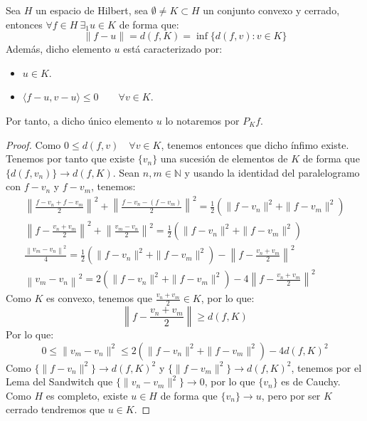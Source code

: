 \begin{teo}[de la Proyección]
    Sea $H$ un espacio de Hilbert, sea $\emptyset \neq K \subset H$ un conjunto convexo y cerrado, entonces $\forall f\in H~\exists_1 u\in K$ de forma que:
    \begin{equation*}
        \|f-u\| = d(f,K) = \inf \{d(f,v) : v\in K\}
    \end{equation*}
    Además, dicho elemento $u$ está caracterizado por:
    \begin{itemize}
        \item $u\in K$.
        \item $\langle f-u,v-u \rangle \leq 0 \qquad \forall v\in K$.
    \end{itemize}
    Por tanto, a dicho único elemento $u$ lo notaremos por $P_Kf$.
    \begin{proof}
        Como $0\leq d(f,v) \quad \forall v\in K$, tenemos entonces que dicho ínfimo existe. Tenemos por tanto que existe $\{v_n\}$ una sucesión de elementos de $K$ de forma que $\{d(f,v_n)\}\to d(f,K)$. Sean $n,m\in \mathbb{N}$ y usando la identidad del paralelogramo con $f-v_n$ y $f-v_m$, tenemos:
        \begin{gather*}
            \left\| \frac{f-v_n + f-v_m}{2} \right\|^2 + \left\| \frac{f-v_n-(f-v_m)}{2} \right\|^2 = \frac{1}{2}\left(\|f-v_n\|^2 + \|f-v_m\|^2\right)\\
            \left\| f - \frac{v_n+v_m}{2} \right\|^2 + \left\| \frac{v_m - v_n}{2} \right\|^2 = \frac{1}{2}\left(\|f-v_n\|^2 + \|f-v_m\|^2\right)\\
            \frac{\left\| v_m-v_n \right\|^2}{4} = \frac{1}{2}\left(\|f-v_n\|^2 + \|f-v_m\|^2\right) - \left\| f - \frac{v_n+v_m}{2} \right\|^2\\
            \left\| v_m-v_n \right\|^2 = 2\left(\|f-v_n\|^2 + \|f-v_m\|^2\right) - 4\left\| f - \frac{v_n+v_m}{2} \right\|^2
        \end{gather*}
        Como $K$ es convexo, tenemos que $\frac{v_n+v_m}{2}\in K$, por lo que:
        \begin{equation*}
            \left\| f-\dfrac{v_n+v_m}{2}\right\| \geq d(f,K)
        \end{equation*}
        Por lo que:
        \begin{equation*}
            0 \leq \|v_m - v_n\|^2 \leq 2(\|f-v_n\|^2 + \|f-v_m\|^2) - 4d(f,K)^2
        \end{equation*}
        Como $\{\|f-v_n\|^2\} \to d(f,K)^2$ y $\{\|f-v_m\|^2\}\to d(f,K)^2$, tenemos por el Lema del Sandwitch que $\{\|v_n - v_m\|^2\}\to 0$, por lo que $\{v_n\}$ es de Cauchy. Como $H$ es completo, existe $u\in H$ de forma que $\{v_n\}\to u$, pero por ser $K$ cerrado tendremos que $u\in K$.


\end{proof}
\end{teo}
